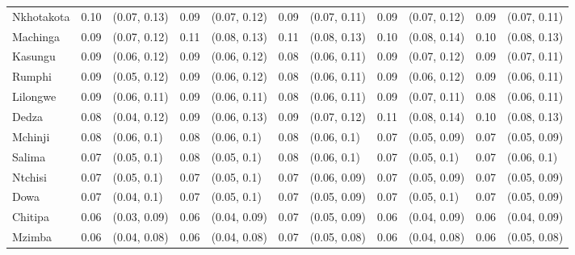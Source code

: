 \begin{tabular}{lrlrlrlrlrl}
Nkhotakota & 0.10 & (0.07, 0.13) & 0.09 & (0.07, 0.12) & 0.09 & (0.07, 0.11) & 0.09 & (0.07, 0.12) & 0.09 & (0.07, 0.11)\\
Machinga & 0.09 & (0.07, 0.12) & 0.11 & (0.08, 0.13) & 0.11 & (0.08, 0.13) & 0.10 & (0.08, 0.14) & 0.10 & (0.08, 0.13)\\
Kasungu & 0.09 & (0.06, 0.12) & 0.09 & (0.06, 0.12) & 0.08 & (0.06, 0.11) & 0.09 & (0.07, 0.12) & 0.09 & (0.07, 0.11)\\
Rumphi & 0.09 & (0.05, 0.12) & 0.09 & (0.06, 0.12) & 0.08 & (0.06, 0.11) & 0.09 & (0.06, 0.12) & 0.09 & (0.06, 0.11)\\
Lilongwe & 0.09 & (0.06, 0.11) & 0.09 & (0.06, 0.11) & 0.08 & (0.06, 0.11) & 0.09 & (0.07, 0.11) & 0.08 & (0.06, 0.11)\\
Dedza & 0.08 & (0.04, 0.12) & 0.09 & (0.06, 0.13) & 0.09 & (0.07, 0.12) & 0.11 & (0.08, 0.14) & 0.10 & (0.08, 0.13)\\
Mchinji & 0.08 & (0.06, 0.1) & 0.08 & (0.06, 0.1) & 0.08 & (0.06, 0.1) & 0.07 & (0.05, 0.09) & 0.07 & (0.05, 0.09)\\
Salima & 0.07 & (0.05, 0.1) & 0.08 & (0.05, 0.1) & 0.08 & (0.06, 0.1) & 0.07 & (0.05, 0.1) & 0.07 & (0.06, 0.1)\\
Ntchisi & 0.07 & (0.05, 0.1) & 0.07 & (0.05, 0.1) & 0.07 & (0.06, 0.09) & 0.07 & (0.05, 0.09) & 0.07 & (0.05, 0.09)\\
Dowa & 0.07 & (0.04, 0.1) & 0.07 & (0.05, 0.1) & 0.07 & (0.05, 0.09) & 0.07 & (0.05, 0.1) & 0.07 & (0.05, 0.09)\\
Chitipa & 0.06 & (0.03, 0.09) & 0.06 & (0.04, 0.09) & 0.07 & (0.05, 0.09) & 0.06 & (0.04, 0.09) & 0.06 & (0.04, 0.09)\\
Mzimba & 0.06 & (0.04, 0.08) & 0.06 & (0.04, 0.08) & 0.07 & (0.05, 0.08) & 0.06 & (0.04, 0.08) & 0.06 & (0.05, 0.08)\\
\bottomrule
\end{tabular}
